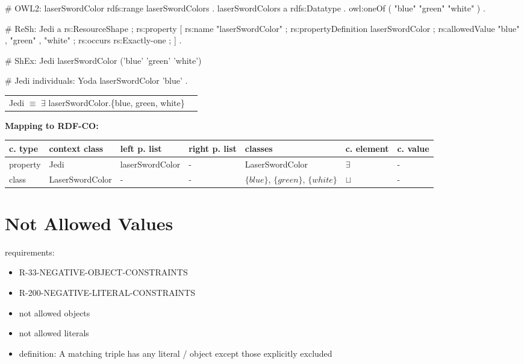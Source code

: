 \documentclass{llncs}
\newenvironment{gcotable}{
  \scriptsize
  \sffamily
  \vspace{0cm}
	\begin{center}
	\textbf{\vspace{0.4cm}Mapping to RDF-CO:} \\
  \begin{tabular}{l|l|l|l|l|l|l}
	\hline
  \textbf{c. type} & \textbf{context class} & \textbf{left p. list} & \textbf{right p. list} & \textbf{classes} & \textbf{c. element} & \textbf{c. value} \\
  \hline

}{
  \hline
  \end{tabular}
	\end{center}
}
\newenvironment{DL}{
  \vspace{0cm}
	\begin{center}
  \begin{tabular}{r l}

}{
  \end{tabular}
	\end{center}
}
\begin{document}
\begin{ex}
# OWL2:
laserSwordColor rdfs:range laserSwordColors . 
laserSwordColors
    a rdfs:Datatype .
    owl:oneOf ( "blue" "green" "white" ) .
\end{ex}

\begin{ex}
# ReSh:
Jedi a rs:ResourceShape ;
    rs:property [
        rs:name "laserSwordColor" ;
        rs:propertyDefinition laserSwordColor ;
        rs:allowedValue "blue" , "green" , "white" ;
        rs:occurs rs:Exactly-one ; ] .
\end{ex}

\begin{ex}
# ShEx:
Jedi {
    laserSwordColor ('blue' 'green' 'white') }
\end{ex}

\begin{ex}
# Jedi individuals:
Yoda 
    laserSwordColor 'blue' .
\end{ex}

\begin{DL}
Jedi $\equiv$ $\exists$ laserSwordColor.\{blue, green, white\} \\
\end{DL}

\begin{gcotable}
property & Jedi & laserSwordColor & - & LaserSwordColor & $\exists$ & - \\
class & LaserSwordColor & - & - & $\{blue\}$, $\{green\}$, $\{white\}$ & $\sqcup$ & - \\
\end{gcotable}

\section{Not Allowed Values}

requirements:

\begin{itemize}
	\item R-33-NEGATIVE-OBJECT-CONSTRAINTS
	\item R-200-NEGATIVE-LITERAL-CONSTRAINTS
\end{itemize}



\begin{itemize}
	\item not allowed objects
	\item not allowed literals
	\item definition: A matching triple has any literal / object except those explicitly excluded
\end{itemize}
\end{document}
